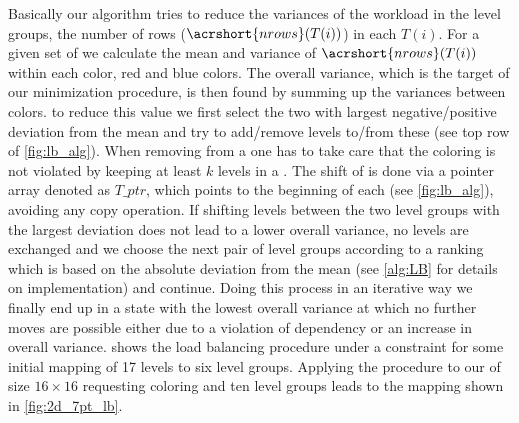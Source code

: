 Basically our algorithm tries to reduce the variances of the workload in the level groups, \ie the number of rows ($\acrshort{nrows}(T(i))$) in each \levelGroup $T(i)$. For a given set of \levelGroups we calculate the mean and variance of $\acrshort{nrows}(T(i))$ within each color, \ie red and blue colors.  
The overall variance, which is the target of our minimization procedure, is then found by summing up the variances between colors. \Inorder to reduce this value we first select the two \levelGroups with largest negative/positive deviation from the mean  and try to add/remove levels to/from these \levelGroups (see top row of \cref{fig:lb_alg}). When removing \levels from a \levelGroup one has to take care that the \DK coloring is not violated by keeping at least $k$ levels in a \levelGroup. The shift of \levels is done via a pointer array denoted as $T\_ptr$, which points to the beginning of each \levelGroup (see \cref{fig:lb_alg}), avoiding any copy operation. If shifting levels between the two level groups with the largest deviation does not lead to a lower overall variance, no levels are exchanged and we choose the next pair of level groups according to a ranking which is based on the absolute deviation from the mean (see \cref{alg:LB} for details on implementation) and continue. Doing this process in an iterative way we finally end up in a state with the lowest overall variance at which no further moves are possible either due to a violation of \DK dependency or an increase in overall variance.  shows the load balancing procedure under a \DTWO constraint for some initial mapping of 17 levels to six level groups. Applying the procedure to our  \stex of size $16 \times 16$  requesting \DTWO coloring and ten level groups leads to the mapping shown in \cref{fig:2d_7pt_lb}. 
  
